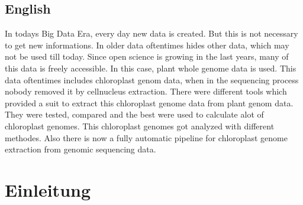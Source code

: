 \documentclass{scrartcl}
\begin{document}
\subsection{English}
\label{sec-1-2}
In todays Big Data Era, every day new data is created. But this is not necessary to get new informations. In older data oftentimes hides other data, which may not be used till today.
Since open science is growing in the last years, many of this data is freely accessible. In this case, plant whole genome data is used. This data oftentimes includes chloroplast
genom data, when in the sequencing process nobody removed it by cellnucleus extraction. There were different tools which provided a suit to extract this chloroplast genome data from plant
genom data. They were tested, compared and the best were used to calculate alot of chloroplast genomes. This chloroplast genomes got analyzed with different methodes. Also there is now
a fully automatic pipeline for chloroplast genome extraction from genomic sequencing data.
\clearpage

\section{Einleitung}
\label{sec-2}
\end{document}
